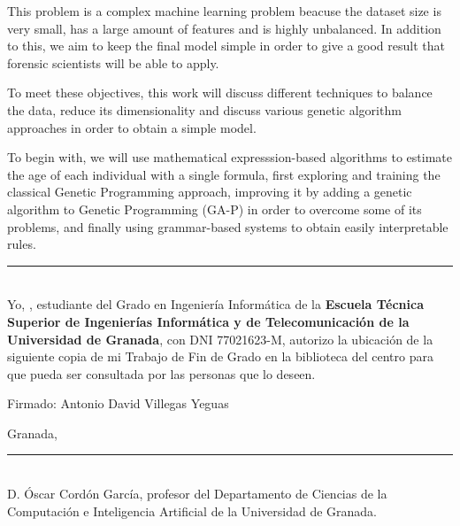 This problem is a complex machine learning problem beacuse the dataset size is very small, has a large amount of features and is highly unbalanced. In addition to this, we aim to keep the final model simple in order to give a good result that forensic scientists will be able to apply.


To meet these objectives, this work will discuss different techniques to balance the data, reduce its dimensionality and discuss various genetic algorithm approaches in order to obtain a simple model.


To begin with, we will use mathematical expresssion-based algorithms to estimate the age of each individual with a single formula, first exploring and training the classical Genetic Programming approach, improving it by adding a genetic algorithm to Genetic Programming (GA-P) in order to overcome some of its problems, and finally using grammar-based systems to obtain easily interpretable rules.



\newpage

\vspace*{2cm}

\rule{\linewidth}{1 mm} \\[1 cm]

{\large Yo, \textbf{\theauthor}, estudiante del Grado en Ingeniería Informática de la \textbf{Escuela Técnica Superior de Ingenierías Informática y de Telecomunicación de la Universidad de Granada}, con DNI 77021623-M, autorizo la ubicación de la siguiente copia de mi Trabajo de Fin de Grado en la biblioteca del centro para que pueda ser consultada por las personas que lo deseen.}

\vspace{7cm}

Firmado: Antonio David Villegas Yeguas

\vspace{2cm}

Granada, \thedate



\newpage

\vspace*{2cm}

\rule{\linewidth}{1 mm} \\[1 cm]

D. Óscar Cordón García, profesor del Departamento de Ciencias de la Computación e Inteligencia Artificial de la Universidad de Granada.

\vspace{1cm}

